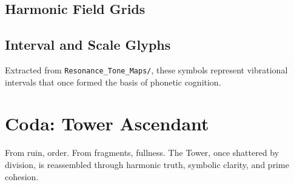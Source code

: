 \documentclass[12pt]{article}
\begin{document}
\subsection{Harmonic Field Grids}

\subsection{Interval and Scale Glyphs}
Extracted from \texttt{Resonance\_Tone\_Maps/}, these symbols represent vibrational intervals that once formed the basis of phonetic cognition.

\section{Coda: Tower Ascendant}
From ruin, order. From fragments, fullness. The Tower, once shattered by division, is reassembled through harmonic truth, symbolic clarity, and prime cohesion.
\end{document}
